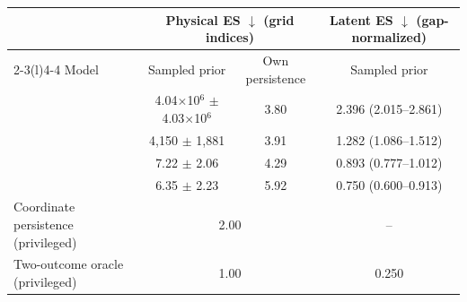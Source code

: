 \begin{tabular}{@{}lccc@{}}
\toprule
 & \multicolumn{2}{c}{Physical ES $\downarrow$ (grid indices)} & Latent ES $\downarrow$ (gap-normalized) \\
\cmidrule(lr){2-3}\cmidrule(l){4-4}
Model & Sampled prior & Own persistence & Sampled prior \\
\midrule
\emadet{} & 4.04$\times$10$^{6}$ $\pm$ 4.03$\times$10$^{6}$ & 3.80 & 2.396 (2.015--2.861) \\
\emavar{} & 4{,}150 $\pm$ 1{,}881 & 3.91 & 1.282 (1.086--1.512) \\
\shdet{} & 7.22 $\pm$ 2.06 & 4.29 & 0.893 (0.777--1.012) \\
\shvar{} & 6.35 $\pm$ 2.23 & 5.92 & 0.750 (0.600--0.913) \\
\midrule
Coordinate persistence (privileged) & \multicolumn{2}{c}{2.00} & -- \\
Two-outcome oracle (privileged) & \multicolumn{2}{c}{1.00} & 0.250 \\
\bottomrule
\end{tabular}
